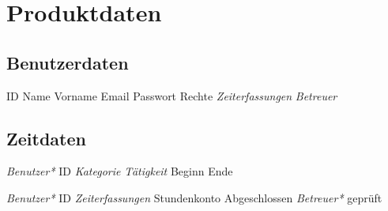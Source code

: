 \section{Produktdaten}

\subsection{Benutzerdaten}
\begin{requirements}
	\begin{requirements}
		 ID
		 Name
		 Vorname
		 Email
		 Passwort
		 Rechte
		 \emph{Zeiterfassungen}
		 \emph{Betreuer}
	\end{requirements}
\end{requirements}

\subsection{Zeitdaten}
\begin{requirements}
	\req [Zeiterfassung] {D20}
	\begin{requirements}
		 \emph{Benutzer*} ID
		 \emph{Kategorie}
		 \emph{Tätigkeit}
		 Beginn
		 Ende
	\end{requirements}

	\req [Stundenzettel] {D30}
	\begin{requirements}
		 \emph{Benutzer*} ID
		 \emph{Zeiterfassungen}
		 Stundenkonto
		 Abgeschlossen
		 \emph{Betreuer*} geprüft
	\end{requirements}
\end{requirements}


